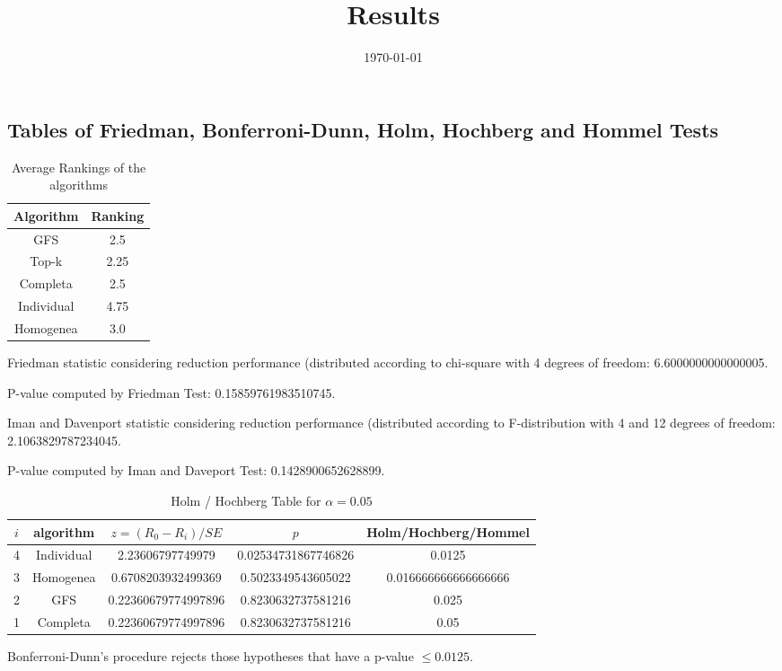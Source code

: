 \documentclass[a4paper,10pt]{article}
\title{Results}
\author{}
\date{\today}
\begin{document}
\begin{landscape}
\oddsidemargin 0in \topmargin 0in\maketitle
\section{Tables of Friedman, Bonferroni-Dunn, Holm, Hochberg and Hommel Tests}
\begin{table}[!htp]
\centering
\caption{Average Rankings of the algorithms
}\begin{tabular}{c|c}
Algorithm&Ranking\\
\hline
GFS&2.5\\
Top-k&2.25\\
Completa&2.5\\
Individual&4.75\\
Homogenea&3.0\\
\end{tabular}
\end{table}


Friedman statistic considering reduction performance (distributed according to chi-square with 4 degrees of freedom: 6.6000000000000005.


P-value computed by Friedman Test: 0.15859761983510745.\newline

Iman and Davenport statistic considering reduction performance (distributed according to F-distribution with 4 and 12 degrees of freedom: 2.1063829787234045.


P-value computed by Iman and Daveport Test: 0.1428900652628899.\newline

\begin{table}[!htp]
\centering\tiny
\caption{Holm / Hochberg Table for $\alpha=0.05$}
\begin{tabular}{ccccc}
$i$&algorithm&$z=(R_0 - R_i)/SE$&$p$&Holm/Hochberg/Hommel\\
\hline
4&Individual&2.23606797749979&0.02534731867746826&0.0125\\
3&Homogenea&0.6708203932499369&0.5023349543605022&0.016666666666666666\\
2&GFS&0.22360679774997896&0.8230632737581216&0.025\\
1&Completa&0.22360679774997896&0.8230632737581216&0.05\\
\hline
\end{tabular}
\end{table}
Bonferroni-Dunn's procedure rejects those hypotheses that have a p-value $\le0.0125$.



\end{landscape}
\end{document}
